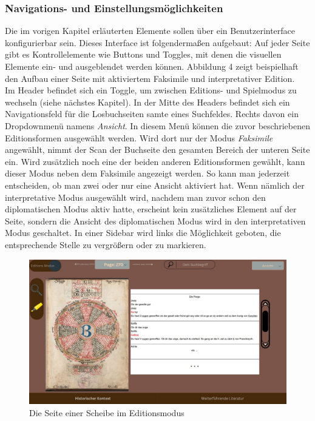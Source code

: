 \documentclass[12pt,a4paper]{article}
\begin{document}
		\subsubsection{Navigations- und Einstellungsmöglichkeiten}
		Die im vorigen Kapitel erläuterten Elemente sollen über ein Benutzerinterface konfigurierbar sein. 
		Dieses Interface ist folgendermaßen aufgebaut: Auf jeder Seite gibt es Kontrollelemente wie Buttons und Toggles, 
		mit denen die visuellen Elemente ein- und ausgeblendet werden können. Abbildung 4 zeigt beispielhaft den Aufbau einer Seite mit 
		aktiviertem Faksimile und interpretativer Edition.\\
		Im Header befindet sich ein Toggle, um zwischen Editions- und Spielmodus zu wechseln (siehe nächstes Kapitel). 
		In der Mitte des Headers befindet sich ein Navigationsfeld für die Losbuchseiten samte eines Suchfeldes. Rechts 
		davon ein Dropdownmenü namens \textit{Ansicht}. In diesem Menü können die zuvor beschriebenen Editionsformen ausgewählt werden. 
		Wird dort nur der Modus \textit{Faksimile} angewählt, nimmt der Scan der Buchseite den gesamten Bereich der unteren Seite ein. 
		Wird zusätzlich noch eine der beiden anderen Editionsformen gewählt, kann dieser Modus neben dem Faksimile angezeigt werden. 
		So kann man jederzeit entscheiden, ob man zwei oder nur eine Ansicht aktiviert hat. Wenn nämlich der interpretative Modus ausgewählt wird,
		nachdem man zuvor schon den diplomatischen Modus aktiv hatte, erscheint kein zusätzliches Element auf der Seite, sondern die Ansicht des diplomatischen 
		Modus wird in den interpretativen Modus geschaltet. In einer Sidebar wird links die Möglichkeit geboten, die entsprechende Stelle zu vergrößern oder zu markieren.
			\begin{figure}[htbp]
				\centering
				\includegraphics[scale=0.3]{ansicht-startseite-editionsmodus.JPG}
				\caption{Die Seite einer Scheibe im Editionsmodus}
				\label{Abbildung 4}
			\end{figure}
\end{document}
